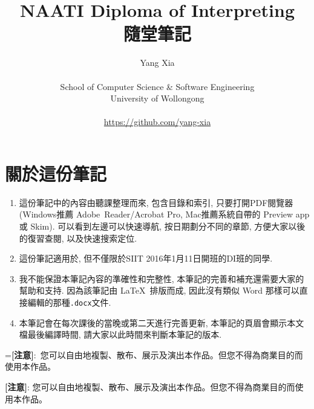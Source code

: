 \documentclass[12pt]{book}
\title{NAATI Diploma of Interpreting\\ 隨堂筆記}
\author{\LARGE{Yang Xia}\\ \\ School of Computer Science \& Software Engineering \\ University of Wollongong \\ \\ \url{https://github.com/yang-xia}}
\date{}
\makeatletter
\newcommand{\mybox}[1]{
  \setbox0=\hbox{#1}
  \setlength{\@tempdima}{\dimexpr\wd0+13pt}
  \begin{tcolorbox}[colframe=mycolor,boxrule=0.5pt,arc=4pt,
      left=6pt,right=6pt,top=6pt,bottom=6pt,boxsep=0pt,width=\@tempdima]
    #1
  \end{tcolorbox}
}
\makeatother
\begin{document}
\maketitle{}

\begingroup
\let\cleardoublepage\clearpage
\tableofcontents
\thispagestyle{empty}
\endgroup
\newpage

\section*{關於這份筆記}
\begin{tcolorbox}
\begin{enumerate}
	\item 這份筆記中的內容由聽課整理而來, 包含目錄和索引, 只要打開PDF閱覽器 (Windows推薦 Adobe\texttrademark\ Reader/Acrobat Pro, Mac推薦系統自帶的 Preview app 或 Skim). 可以看到左邊可以快速導航, 按日期劃分不同的章節, 方便大家以後的復習查閱, 以及快速搜索定位.
	\item 這份筆記適用於, 但不僅限於SIIT 2016年1月11日開班的DI班的同學.
	\item 我不能保證本筆記內容的準確性和完整性, 本筆記的完善和補充還需要大家的幫助和支持. 因為該筆記由 \LaTeX\ 排版而成, 因此沒有類似 Word 那樣可以直接編輯的那種\texttt{.docx}文件.
	\item 本筆記會在每次課後的當晚或第二天進行完善更新, 本筆記的頁眉會顯示本文檔最後編譯時間, 請大家以此時間來判斷本筆記的版本.
\end{enumerate}
\end{tcolorbox}

\begin{tcolorbox}
\doclicenseThis
\mybox{\centering \textbf{[注意]}: 您可以自由地複製、散布、展示及演出本作品。但您不得為商業目的而使用本作品。}
\end{tcolorbox}











\end{document}
